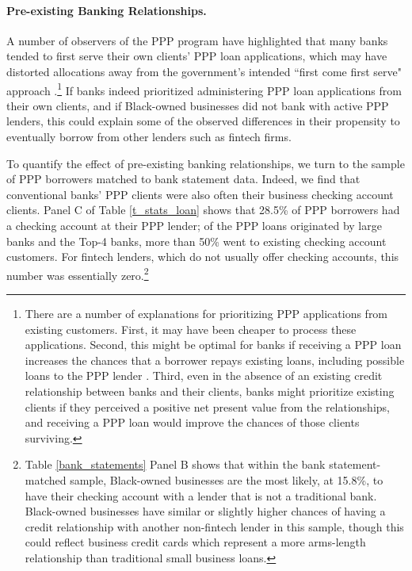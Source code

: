 \documentclass[11pt]{article}
\begin{document}
\paragraph{Pre-existing Banking Relationships.} A number of observers of the PPP program have highlighted that many banks tended to first serve their own clients' PPP loan applications, which may have distorted allocations away from the government's intended ``first come first serve" approach  \citep{nytmin,ap_ppp, li2020supplies}.\footnote{There are a number of explanations for prioritizing PPP applications from existing customers. First, it may have been cheaper to process these applications. Second, this might be optimal for banks if receiving a PPP loan increases the chances that a borrower repays existing loans, including possible loans to the PPP lender \citep{granja2020}. Third, even in the absence of an existing credit relationship between banks and their clients, banks might prioritize existing clients if they perceived a positive net present value from the relationships, and receiving a PPP loan would improve the chances of those clients surviving.} If banks indeed prioritized administering PPP loan applications from their own clients, and if Black-owned businesses did not bank with active PPP lenders, this could explain some of the observed differences in their propensity to eventually borrow from other lenders such as fintech firms. 

To quantify the effect of pre-existing banking relationships, we turn to the sample of PPP borrowers matched to bank statement data. Indeed, we find that conventional banks' PPP clients were also often their business checking account clients. Panel C of Table \ref{t_stats_loan} shows that 28.5\% of PPP borrowers had a checking account at their PPP lender; of the PPP loans originated by large banks and the Top-4 banks, more than 50\% went to existing checking account customers. For fintech lenders, which do not usually offer checking accounts, this number was essentially zero.\footnote{Table \ref{bank_statements} Panel B shows that within the bank statement-matched sample, Black-owned businesses are the most likely, at 15.8\%, to have their checking account with a lender that is not a traditional bank. Black-owned businesses have similar or slightly higher chances of having a credit relationship with another non-fintech lender in this sample, though this could reflect business credit cards which represent a more arms-length relationship than traditional small business loans.}  
\end{document}
